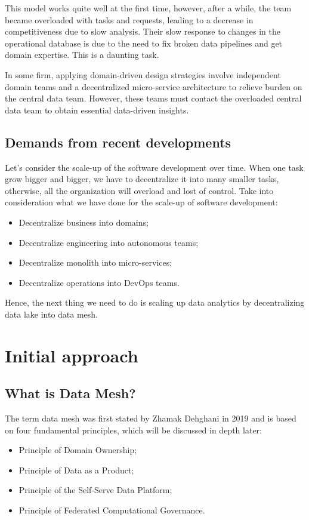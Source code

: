 \documentclass[12pt, a4paper]{book}
\begin{document}
This model works quite well at the first time, however, after a while, the team became overloaded with tasks and requests, leading to a decrease in competitiveness due to slow analysis. Their slow response to changes in the operational database is due to the need to fix broken data pipelines and get domain expertise. This is a daunting task. \cite{datamesh2022prologue,datameshweb}

In some firm, applying domain-driven design strategies involve independent domain teams and a decentralized micro-service architecture to relieve burden on the central data team. However, these teams must contact the overloaded central data team to obtain essential data-driven insights. \cite{datamesh2022prologue}

\subsection{Demands from recent developments}
Let's consider the scale-up of the software development over time. When one task grow bigger and bigger, we have to decentralize it into many smaller tasks, otherwise, all the organization will overload and lost of control. Take into consideration what we have done for the scale-up of software development:
	\begin{itemize}
		\item Decentralize business into domains;
		\item Decentralize engineering into autonomous teams;
		\item Decentralize monolith into micro-services;
		\item Decentralize operations into DevOps teams.
	\end{itemize}

Hence, the next thing we need to do is scaling up data analytics by decentralizing data lake into data mesh.\cite{datameshweb}

\section{Initial approach}
\subsection{What is Data Mesh?}
The term data mesh was first stated by Zhamak Dehghani in 2019 and is based on four fundamental principles, which will be discussed in depth later:
	\begin{itemize}[nosep]
		\item Principle of Domain Ownership;
		\item Principle of Data as a Product;
		\item Principle of the Self-Serve Data Platform;
		\item Principle of Federated Computational Governance.
	\end{itemize}
\end{document}
